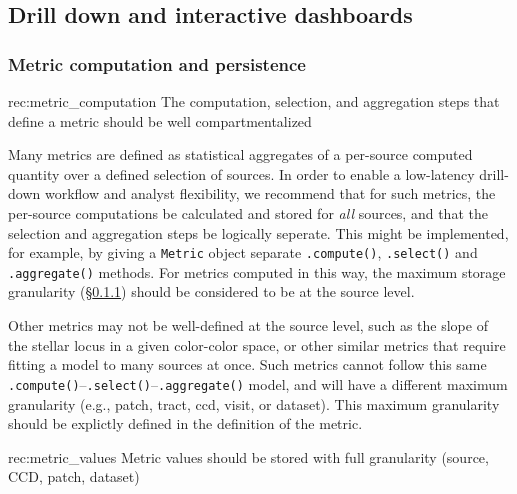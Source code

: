\subsection{Drill down and interactive dashboards}
\label{sec:comp:drill}

\subsubsection{Metric computation and persistence} \label{sec:metric_storage}

\begin{recommendation}
    {rec:metric_computation}
    {The computation, selection, and aggregation steps that define a metric should be well compartmentalized}
\end{recommendation}

Many metrics are defined as statistical aggregates of a per-source computed quantity over a defined selection of sources.
In order to enable a low-latency drill-down workflow and analyst flexibility, we recommend that for such metrics, the per-source computations be calculated and stored for \emph{all} sources, and that the selection and aggregation steps be logically seperate.
This might be implemented, for example, by giving a \texttt{Metric} object separate \texttt{.compute()}, \texttt{.select()} and \texttt{.aggregate()} methods.
For metrics computed in this way, the maximum storage granularity (\S \ref{sec:metric_storage}) should be considered to be at the source level.

Other metrics may not be well-defined at the source level, such as the slope of the stellar locus in a given color-color space, or other similar metrics that require fitting a model to many sources at once.
Such metrics cannot follow this same \texttt{.compute()}--\texttt{.select()}--\texttt{.aggregate()} model, and will have a different maximum granularity (e.g., patch, tract, ccd, visit, or dataset).
This maximum granularity should be explictly defined in the definition of the metric.

\begin{recommendation}
    {rec:metric_values}
    {Metric values should be stored with full granularity (source, CCD, patch, dataset)}
\end{recommendation}

